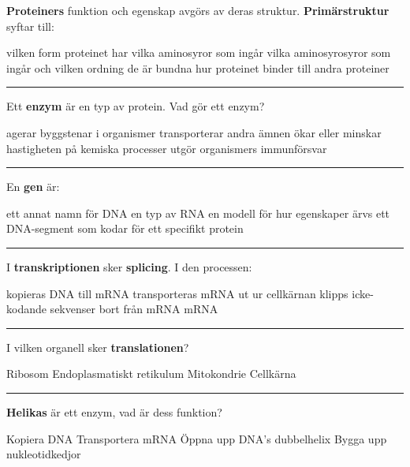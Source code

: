 \documentclass{exam}
\begin{document}
\begin{questions}
\question \textbf{Proteiners} funktion och egenskap avgörs av deras struktur. \textbf{Primärstruktur} syftar till:  
\begin{checkboxes}
   \choice vilken form proteinet har
   \choice vilka aminosyror som ingår
   \choice vilka aminosyrosyror som ingår och vilken ordning de är bundna
   \choice hur proteinet binder till andra proteiner
\end{checkboxes}
\vspace{5mm} %
\hrule 
\vspace{5mm} %
\question Ett \textbf{enzym} är en typ av protein. Vad gör ett enzym?  
\begin{checkboxes}
   \choice agerar byggstenar i organismer
   \choice transporterar andra ämnen
   \choice ökar eller minskar hastigheten på kemiska processer
   \choice utgör organismers immunförsvar
\end{checkboxes}

\vspace{5mm} %
\hrule 
\vspace{5mm} %
\question En \textbf{gen} är:  
\begin{checkboxes}
   \choice ett annat namn för DNA
   \choice en typ av RNA
   \choice en modell för hur egenskaper ärvs
   \choice ett DNA-segment som kodar för ett specifikt protein
\end{checkboxes}

\vspace{5mm} %
\hrule 
\vspace{5mm} %
\question  I \textbf{transkriptionen} sker \textbf{splicing}. I den processen:  
\begin{checkboxes}
   \choice kopieras DNA till mRNA
   \choice transporteras mRNA ut ur cellkärnan
   \choice klipps icke-kodande sekvenser bort från mRNA
   \choice mRNA 
\end{checkboxes}

\vspace{5mm} %
\hrule 
\vspace{5mm} %
\question  I vilken organell sker \textbf{translationen}?
\begin{checkboxes}
   \choice Ribosom
   \choice Endoplasmatiskt retikulum
   \choice Mitokondrie
   \choice Cellkärna 
\end{checkboxes}

\vspace{5mm} %
\hrule 
\vspace{5mm} %
\question  \textbf{Helikas} är ett enzym, vad är dess funktion?
\begin{checkboxes}
   \choice Kopiera DNA
   \choice Transportera mRNA
   \choice Öppna upp DNA's dubbelhelix
   \choice Bygga upp nukleotidkedjor 
\end{checkboxes}
\break


\end{questions}
\end{document}
